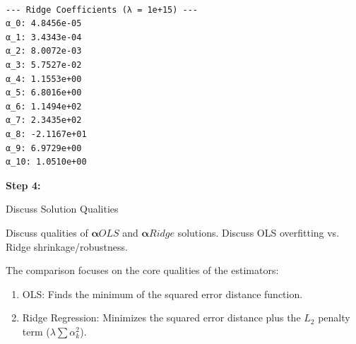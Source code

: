 \hypertarget{76b480dd}{}
\begin{Shaded}
\begin{Highlighting}[]
\OperatorTok{=} \OperatorTok{**}

\OperatorTok{=}\OperatorTok{=}\OperatorTok{=}\NormalTok{)}

\OperatorTok{=}

\NormalTok{(}\SpecialCharTok{\{}\NormalTok{)}
 
    \NormalTok{(}\SpecialCharTok{\{}\SpecialCharTok{\}}\SpecialStringTok{: }\SpecialCharTok{\{}\NormalTok{)}
\end{Highlighting}
\end{Shaded}

\begin{verbatim}

--- Ridge Coefficients (λ = 1e+15) ---
α_0: 4.8456e-05
α_1: 3.4343e-04
α_2: 8.0072e-03
α_3: 5.7527e-02
α_4: 1.1553e+00
α_5: 6.8016e+00
α_6: 1.1494e+02
α_7: 2.3435e+02
α_8: -2.1167e+01
α_9: 6.9729e+00
α_10: 1.0510e+00
\end{verbatim}

\leavevmode{}%
\textbf{Step 4:}

Discuss Solution Qualities

Discuss qualities of \(\boldsymbol{\alpha}{OLS}\) and
\(\boldsymbol{\alpha}{Ridge}\) solutions. Discuss OLS overfitting vs.
Ridge shrinkage/robustness.

The comparison focuses on the core qualities of the estimators:

\begin{enumerate}
\item
  OLS: Finds the minimum of the squared error distance function.
\item
  Ridge Regression: Minimizes the squared error distance plus the
  \(L_2\) penalty term (\(\lambda \sum \alpha_k^2\)).
\end{enumerate}

